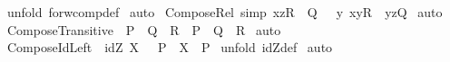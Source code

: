 \begin{isabellebody}
%
\isadelimproof
%
\endisadelimproof
%
\isatagproof
{}\isamarkupfalse%
\ {\isacharparenleft}unfold\ forw{\isacharunderscore}comp{\isacharunderscore}def{\isacharparenright}\isanewline
{}\isamarkupfalse%
\ auto\isanewline
{}\isamarkupfalse%
%
\endisatagproof
{\isafoldproof}%
%
\isadelimproof
\isanewline
%
\endisadelimproof
\isanewline
\isanewline
{}\isamarkupfalse%
\ Compose{\isacharunderscore}Rel\ {\isacharbrackleft}simp{\isacharbrackright}{\isacharcolon}\ {\isachardoublequoteopen}{\isacharparenleft}x{\isacharcomma}z{\isacharparenright}{\isacharcolon}{\isacharparenleft}R\ {\isacharpercent}{\isacharsemicolon}\ Q{\isacharparenright}\ {\isacharequal}\ {\isacharparenleft}{\isacharquery}\ y{\isachardot}\ {\isacharparenleft}x{\isacharcomma}y{\isacharparenright}{\isacharcolon}R\ {\isacharampersand}\ {\isacharparenleft}y{\isacharcomma}z{\isacharparenright}{\isacharcolon}Q{\isacharparenright}{\isachardoublequoteclose}\isanewline
%
\isadelimproof
%
\endisadelimproof
%
\isatagproof
{}\isamarkupfalse%
\ auto\isanewline
{}\isamarkupfalse%
%
\endisatagproof
{\isafoldproof}%
%
\isadelimproof
\isanewline
%
\endisadelimproof
\isanewline
{}\isamarkupfalse%
\ Compose{\isacharunderscore}Transitive\ {\isacharcolon}\ {\isachardoublequoteopen}{\isacharparenleft}P\ {\isacharpercent}{\isacharsemicolon}\ {\isacharparenleft}Q\ {\isacharpercent}{\isacharsemicolon}\ R{\isacharparenright}{\isacharparenright}\ {\isacharequal}\ {\isacharparenleft}{\isacharparenleft}P\ {\isacharpercent}{\isacharsemicolon}\ Q{\isacharparenright}\ {\isacharpercent}{\isacharsemicolon}\ R{\isacharparenright}{\isachardoublequoteclose}\isanewline
%
\isadelimproof
%
\endisadelimproof
%
\isatagproof
{}\isamarkupfalse%
\ auto\isanewline
{}\isamarkupfalse%
%
\endisatagproof
{\isafoldproof}%
%
\isadelimproof
\isanewline
%
\endisadelimproof
\isanewline
\isanewline
\isanewline
{}\isamarkupfalse%
\ Compose{\isacharunderscore}Id{\isacharunderscore}Left\ {\isacharcolon}\ {\isachardoublequoteopen}{\isacharparenleft}{\isacharparenleft}idZ\ X{\isacharparenright}\ {\isacharpercent}{\isacharsemicolon}\ \ P{\isacharparenright}\ {\isacharequal}\ {\isacharparenleft}X\ {\isacharless}{\isacharcolon}\ P{\isacharparenright}{\isachardoublequoteclose}\isanewline
%
\isadelimproof
%
\endisadelimproof
%
\isatagproof
{}\isamarkupfalse%
\ {\isacharparenleft}unfold\ idZ{\isacharunderscore}def{\isacharparenright}\isanewline
{}\isamarkupfalse%
\ auto\isanewline

\end{isabellebody}
